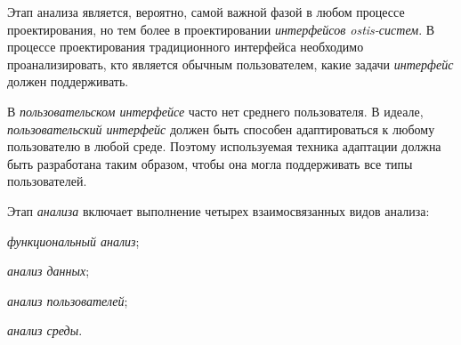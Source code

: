 Этап анализа является, вероятно, самой важной фазой в любом процессе проектирования, но тем более в проектировании \textit{интерфейсов ostis-систем}. В процессе проектирования традиционного интерфейса необходимо проанализировать, кто является обычным пользователем, какие задачи \textit{интерфейс} должен поддерживать. 

В \textit{пользовательском интерфейсе} часто нет среднего пользователя.
В идеале, \textit{пользовательский интерфейс} должен быть способен адаптироваться к любому пользователю в любой среде. Поэтому используемая техника адаптации должна быть разработана таким образом, чтобы она могла поддерживать все типы пользователей.

Этап \textit{анализа} включает выполнение четырех взаимосвязанных видов анализа:
\begin{textitemize}
    \item \textit{функциональный анализ};
    \item \textit{анализ данных};
    \item \textit{анализ пользователей};
    \item \textit{анализ среды}.
\end{textitemize}

